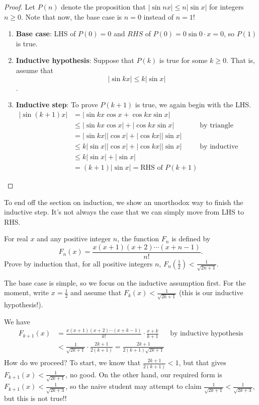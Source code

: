 \documentclass[../main.tex]{subfiles}
\begin{document}
\begin{proof}
    Let $P(n)$ denote the proposition that $|\sin{nx|}\leq n|\sin{x}|$ for integers $n\geq 0$. Note that now, the base case is $n=0$ instead of $n=1$!

    \begin{enumerate}
        \item \textbf{Base case}: LHS of $P(0)=0$ and $RHS$ of $P(0)=0\sin{0\cdot x}=0$, so $P(1)$ is true.
        \item \textbf{Inductive hypothesis}: Suppose that $P(k)$ is true for some $k \geq 0$. That is, assume that $$|\sin{kx}|\leq k|\sin{x}|$$.
        \item \textbf{Inductive step}: To prove $P(k+1)$ is true, we again begin with the LHS.
        \begin{align*}
            |\sin{(k+1)x}| &= |\sin{kx}\cos{x}+\cos{kx}\sin{x}| \\
            &\leq |\sin{kx}\cos{x}|+|\cos{kx}\sin{x}| &\text{by triangle inequality}\\
            &=|\sin{kx}||\cos{x}|+|\cos{kx}||\sin{x}| \\
            &\leq k|\sin{x}||\cos{x}|+|\cos{kx}||\sin{x}| &\text{by inductive hypothesis} \\
            &\leq k|\sin{x}|+|\sin{x}| \\
            &= (k+1)|\sin{x}|=\text{RHS of $P(k+1)$}
        \end{align*} 
    \end{enumerate}
\end{proof}
To end off the section on induction, we show an unorthodox way to finish the inductive step. It's not always the case that we can simply move from LHS to RHS.
\begin{example}
For real $x$ and any positive integer $n$, the function $F_n$ is defined by
    $$F_n(x)=\frac{x(x+1)(x+2)\cdots(x+n-1)}{n!}.$$
Prove by induction that, for all positive integers $n$, $F_n\left(\frac{1}{2}\right) < \frac{1}{\sqrt{2n+1}}$.
\end{example}
    The base case is simple, so we focus on the inductive assumption first. For the moment, write $x=\frac{1}{2}$ and assume that $F_k(x)<\frac{1}{\sqrt{2k+1}}$ (this is our inductive hypothesis!).
    
    We have
    \begin{align*}
        F_{k+1}(x)&=\frac{x(x+1)(x+2)\cdots(x+k-1)}{k!} \cdot \frac{x+k}{k+1} &\text{by inductive hypothesis}\\
        &< \frac{1}{\sqrt{2k+1}} \cdot \frac{2k+1}{2(k+1)} = \frac{2k+1}{2(k+1)\sqrt{2k+1}} \\
    \end{align*}
    How do we proceed? To start, we know that $\frac{2k+1}{2(k+1)} < 1$, but that gives $F_{k+1}(x) < \frac{1}{\sqrt{2k+1}}$, no good. On the other hand, our required form is $F_{k+1}(x) < \frac{1}{\sqrt{2k+3}}$, so the naive student may attempt to claim $\frac{1}{\sqrt{2k+1}} < \frac{1}{\sqrt{2k+3}}$, but this is not true!!
    
\end{document}

